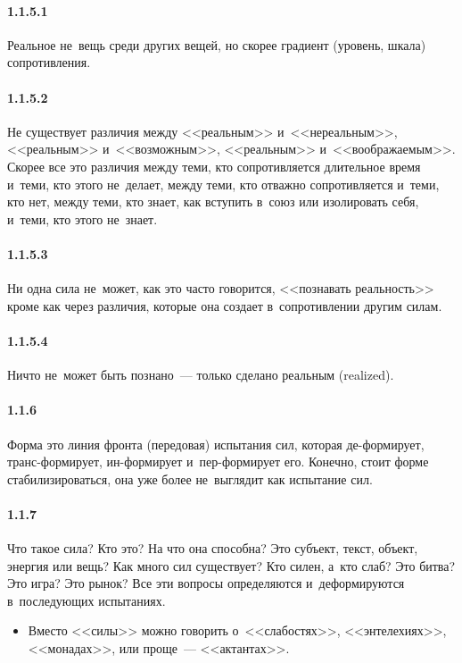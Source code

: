 \paragraph{1.1.5.1}\hypertarget{par:1.1.5.1}{} Реальное не~вещь среди других вещей, но скорее градиент (уровень, шкала) сопротивления.

\paragraph{1.1.5.2}\hypertarget{par:1.1.5.2}{} Не существует различия между <<реальным>> и~<<нереальным>>, <<реальным>> и~<<возможным>>, <<реальным>> и~<<воображаемым>>. Скорее все это различия между теми, кто сопротивляется длительное время и~теми, кто этого не~делает, между теми, кто отважно сопротивляется и~теми, кто нет, между теми, кто знает, как вступить в~союз или изолировать себя, и~теми, кто этого не~знает.

\paragraph{1.1.5.3}\hypertarget{par:1.1.5.3}{} Ни одна сила не~может, как это часто говорится, <<познавать реальность>> кроме как через различия, которые она создает в~сопротивлении другим силам.

\paragraph{1.1.5.4}\hypertarget{par:1.1.5.4}{} Ничто не~может быть познано~--- только сделано реальным (realized).

\paragraph{1.1.6}\hypertarget{par:1.1.6}{} Форма это линия фронта (передовая) испытания сил, которая де-формирует, транс-формирует, ин-формирует и~пер-формирует его. Конечно, стоит форме стабилизироваться, она уже более не~выглядит как испытание сил.

\paragraph{1.1.7}\hypertarget{par:1.1.7}{} Что такое сила? Кто это? На что она способна? Это субъект, текст, объект, энергия или вещь? Как много сил существует? Кто силен, а~кто слаб? Это битва? Это игра?
Это рынок? Все эти вопросы определяются и~деформируются в~последующих
испытаниях.
	\begin{itemize}
	\item Вместо <<силы>> можно говорить о~<<слабостях>>, <<энтелехиях>>, <<монадах>>, или проще~--- <<актантах>>.
	\end{itemize}

